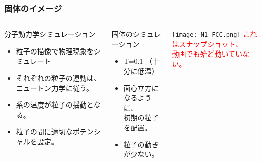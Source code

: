 \documentclass[12pt, dvipdfmx]{beamer}
\begin{document}
\begin{frame}
	\frametitle{固体のイメージ}
		\begin{columns}[T, onlytextwidth]
				\begin{exampleblock}{分子動力学シミュレーション}
					\begin{itemize}
						\item 粒子の描像で物理現象をシミュレート
						\item それぞれの粒子の運動は、ニュートン力学に従う。
						\item 系の温度が粒子の揺動となる。
						\item 粒子の間に適切なポテンシャルを設定。
					\end{itemize}
				\end{exampleblock}
				\begin{block}{固体のシミュレーション}
					\begin{itemize}
						\item T=0.1 （十分に低温）
						\item 面心立方になるように、\\初期の粒子を配置。
						\item 粒子の動きが少ない。
					\end{itemize}
				\end{block}
				\begin{center}
					\texttt{[image: N1\_FCC.png]}
				\textcolor{red}{これはスナップショット、\\動画でも殆ど動いていない。}
				\end{center}
		\end{columns}
\end{frame}
\end{document}
